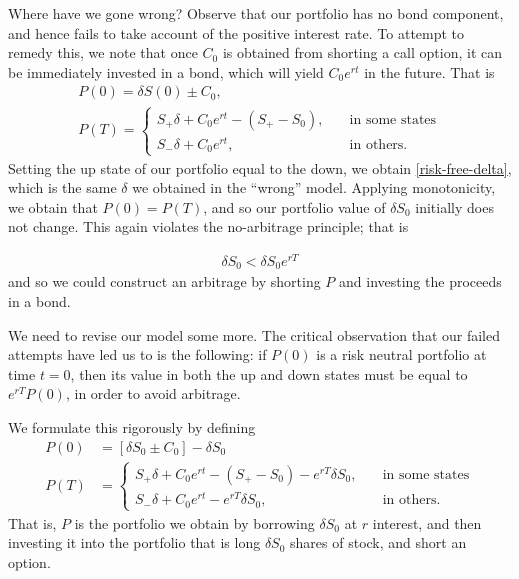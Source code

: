 \documentclass[12pt]{article}
\theoremstyle{plain}
\theoremstyle{definition}
\theoremstyle{remark}
\numberwithin{equation}{section}  %
\begin{document}
Where have we gone wrong? Observe that our portfolio has no bond component,
and hence fails to take account of the positive interest rate. To attempt to remedy this, we note that  once $C_{0}$ is obtained from shorting a call option, it can be
immediately invested in a bond, which will yield $C_{0}e^{rt}$ in the future.
That is
\begin{gather*}
	P(0)  = \delta S(0) \pm C_{0},
	\\
	P(T)  = \begin{cases}
		S_{+} \delta + C_{0}e^{rt} - (S_{+} - S_{0}), \quad & \text{in some states}
		\\
		S_{-} \delta + C_{0}e^{rt}, \quad & \text{in others}.
	\end{cases}
\end{gather*}
Setting the up state of our portfolio equal to the down, we obtain
\eqref{risk-free-delta},
which is the same $\delta$ we obtained in the ``wrong'' model. 
Applying monotonicity, we obtain that $P(0) = P(T)$, and so our portfolio value
of $\delta S_{0}$ initially does not change. This again violates the
no-arbitrage principle; that is

\begin{equation*}
	\begin{split}
		\delta S_{0} < \delta S_{0} e^{rT}
	\end{split}
\end{equation*}
and so we could construct an arbitrage by shorting $P$ and investing
the proceeds in a bond.

We need to revise our model some more. The critical observation that our failed
attempts have led us to is the following: if $P(0)$
is a risk neutral portfolio at time $t=0$, then its value in both the up and down
states must be equal to $e^{rT}P(0)$, in order to avoid arbitrage. 

We formulate this rigorously by defining
\begin{align*}
	P(0) & = [\delta S_{0} \pm C_{0}] - \delta S_{0}
	\\
	P(T)  & = \begin{cases}
		S_{+} \delta + C_{0}e^{rt} - (S_{+} - S_{0}) - e^{rT} \delta S_{0}, \quad & \text{in some states}
		\\
		S_{-} \delta + C_{0}e^{rt} - e^{rT} \delta S_{0}, \quad & \text{in others}.
	\end{cases}
\end{align*}
That is, $P$ is the portfolio we obtain by borrowing $\delta S_{0}$
at $r$ interest, and then investing it into the portfolio that is long
$\delta S_{0}$ shares of stock, and short an option.
\end{document}
